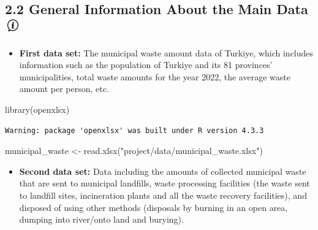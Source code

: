 \documentclass[
  11pt,
  a4paper,
  DIV=11,
  numbers=noendperiod]{scrartcl}
\newenvironment{Shaded}{\begin{snugshade}}{\end{snugshade}}
\newcommand{\FunctionTok}[1]{\textcolor[rgb]{0.28,0.35,0.67}{#1}}
\newcommand{\NormalTok}[1]{\textcolor[rgb]{0.00,0.23,0.31}{#1}}
\newcommand{\OtherTok}[1]{\textcolor[rgb]{0.00,0.23,0.31}{#1}}
\newcommand{\StringTok}[1]{\textcolor[rgb]{0.13,0.47,0.30}{#1}}
\providecommand{\tightlist}{%
  \setlength{\itemsep}{0pt}\setlength{\parskip}{0pt}}\usepackage{longtable,booktabs,array}
\begin{document}
\subsection[{2.2 General Information About the Main Data}
]{\texorpdfstring{{2.2 General Information About the Main Data}
\protect\includegraphics[width=0.27083in,height=0.23958in]{assets/images/info.jpg}}{2.2 General Information About the Main Data }}\label{general-information-about-the-main-data}

\begin{itemize}
\tightlist
\item
  \textbf{First data set:} The municipal waste amount data of Turkiye,
  which includes information such as the population of Turkiye and its
  81 provinces' municipalities, total waste amounts for the year 2022,
  the average waste amount per person, etc.
\end{itemize}

\begin{Shaded}
\begin{Highlighting}[]
\FunctionTok{library}\NormalTok{(openxlsx)}
\end{Highlighting}
\end{Shaded}

\begin{verbatim}
Warning: package 'openxlsx' was built under R version 4.3.3
\end{verbatim}

\begin{Shaded}
\begin{Highlighting}[]
\NormalTok{municipal\_waste }\OtherTok{\textless{}{-}} \FunctionTok{read.xlsx}\NormalTok{(}\StringTok{"project/data/municipal\_waste.xlsx"}\NormalTok{)}
\end{Highlighting}
\end{Shaded}

\begin{itemize}
\tightlist
\item
  \textbf{Second data set:} Data including the amounts of collected
  municipal waste that are sent to municipal landfills, waste processing
  facilities (the waste sent to landfill sites, incineration plants and
  all the waste recovery facilities), and disposed of using other
  methods (disposals by burning in an open area, dumping into river/onto
  land and burying).
\end{itemize}
\end{document}
